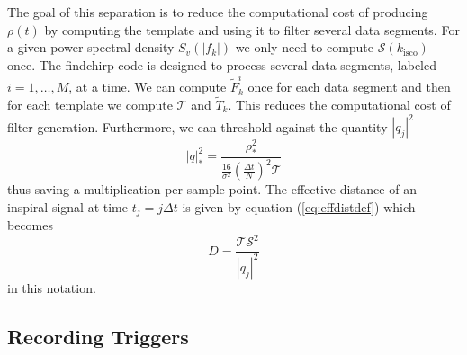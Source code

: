 The goal of this separation is to reduce the computational
cost of producing $\rho(t)$ by computing the template and using it to filter
several data segments. For a given power spectral density $S_v(|f_k|)$ we
only need to compute $\mathcal{S}(k_\mathrm{isco})$ once. The findchirp code
is designed to process several data segments, labeled $i = 1,\ldots,M$, at a
time. We can compute $\tilde{F}_k^i$ once for  each data segment and then for
each template we compute $\mathcal{T}$ and $\tilde{T}_k$. 
This reduces the computational cost of filter generation.
Furthermore, we can threshold against the quantity $|q_j|^2$
\begin{equation}
|q|^2_\ast = \frac{\rho^2_\ast} 
{\frac{16}{\sigma^2}\left(\frac{\Delta t}{N}\right)^2 \mathcal{T}}
\end{equation}
thus saving a multiplication per sample point.
The effective distance of an inspiral signal at time $t_j = j\Delta t$ is
given by equation (\ref{eq:effdistdef}) which becomes
\begin{equation}
D = \frac{\mathcal{T}\mathcal{S}^2}{|q_j|^2}
\end{equation}
in this notation.

\subsection{Recording Triggers}
\label{ss:record}

